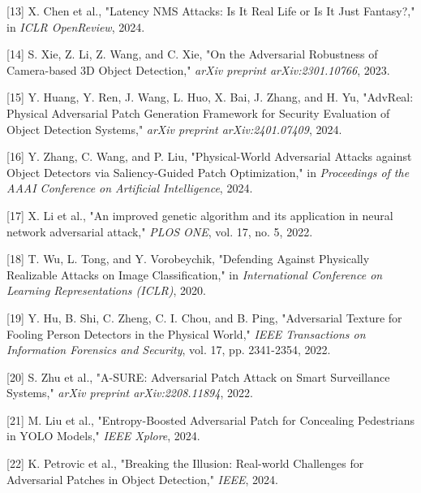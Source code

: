 \documentclass[]{article}
\begin{document}
{[}13{]} X. Chen et al., "Latency NMS Attacks: Is It Real Life or Is It Just Fantasy?," in \emph{ICLR OpenReview}, 2024.

{[}14{]} S. Xie, Z. Li, Z. Wang, and C. Xie, "On the Adversarial Robustness of Camera-based 3D Object Detection," \emph{arXiv preprint arXiv:2301.10766}, 2023.

{[}15{]} Y. Huang, Y. Ren, J. Wang, L. Huo, X. Bai, J. Zhang, and H. Yu, "AdvReal: Physical Adversarial Patch Generation Framework for Security Evaluation of Object Detection Systems," \emph{arXiv preprint arXiv:2401.07409}, 2024.

{[}16{]} Y. Zhang, C. Wang, and P. Liu, "Physical-World Adversarial Attacks against Object Detectors via Saliency-Guided Patch Optimization," in \emph{Proceedings of the AAAI Conference on Artificial Intelligence}, 2024.

{[}17{]} X. Li et al., "An improved genetic algorithm and its application in neural network adversarial attack," \emph{PLOS ONE}, vol. 17, no. 5, 2022.

{[}18{]} T. Wu, L. Tong, and Y. Vorobeychik, "Defending Against Physically Realizable Attacks on Image Classification," in \emph{International Conference on Learning Representations (ICLR)}, 2020.

{[}19{]} Y. Hu, B. Shi, C. Zheng, C. I. Chou, and B. Ping, "Adversarial Texture for Fooling Person Detectors in the Physical World," \emph{IEEE Transactions on Information Forensics and Security}, vol. 17, pp. 2341-2354, 2022.

{[}20{]} S. Zhu et al., "A-SURE: Adversarial Patch Attack on Smart Surveillance Systems," \emph{arXiv preprint arXiv:2208.11894}, 2022.

{[}21{]} M. Liu et al., "Entropy-Boosted Adversarial Patch for Concealing Pedestrians in YOLO Models," \emph{IEEE Xplore}, 2024.

{[}22{]} K. Petrovic et al., "Breaking the Illusion: Real-world Challenges for Adversarial Patches in Object Detection," \emph{IEEE}, 2024.
\end{document}
